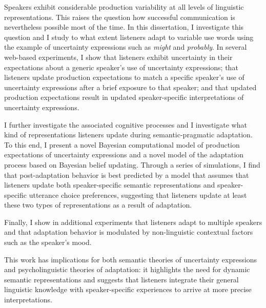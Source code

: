 Speakers exhibit considerable production variability at all levels of linguistic representations. This raises the question how successful communication is nevertheless possible most of the time.
In this dissertation, I investigate this question and I study to what extent listeners adapt to variable use words using the example of uncertainty expressions such as \textit{might} and \textit{probably}.  In several web-based experiments, I show that listeners exhibit uncertainty in their expectations about a generic speaker's use of uncertainty expressions;  that listeners update production expectations to match a specific speaker's use of uncertainty expressions after a brief exposure to that speaker; and that updated production expectations result in updated speaker-specific interpretations of uncertainty expressions. 

I further investigate the associated cognitive processes and I investigate what kind of representations listeners update during semantic-pragmatic adaptation. To this end, I  present a novel Bayesian computational model of production expectations of uncertainty expressions and a novel model of the adaptation process based on Bayesian belief updating.  Through a series of simulations, I find that post-adaptation behavior is best predicted by a model that assumes that listeners update both speaker-specific semantic representations and speaker-specific utterance choice preferences, suggesting that listeners update at least these two types of representations as a result of adaptation. 

Finally, I show in additional experiments that listeners adapt to multiple speakers and that adaptation behavior is modulated by non-linguistic contextual factors such as the speaker's mood. 

This work has implications for both semantic theories of uncertainty expressions and psycholinguistic theories of adaptation: it highlights the need for dynamic semantic representations and suggests that listeners integrate their general linguistic knowledge with speaker-specific experiences to arrive at more precise interpretations.



